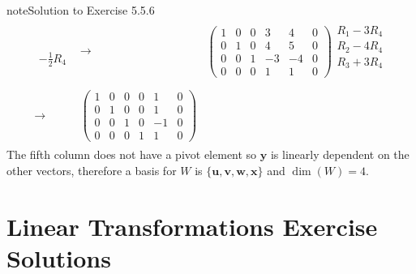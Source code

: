 \documentclass[letterpaper,10pt,english]{jupyterBook}
\begin{document}
\begin{sphinxadmonition}{note}{Solution to Exercise 5.5.6}
\begin{equation*}
\begin{split}
\begin{align*}
    \begin{matrix} \\  \\  \\ -\frac{1}{2}R_4 \end{matrix}  &
    \longrightarrow &
    \left( \begin{array}{ccccc|c}
        1 & 0 & 0 & 3 & 4 & 0 \\
        0 & 1 & 0 & 4 & 5 & 0 \\
        0 & 0 & 1 & -3 & -4 & 0 \\
        0 & 0 & 0 & 1 & 1 & 0 
    \end{array} \right)
    \begin{matrix} R_1 - 3 R_4 \\ R_2 - 4R_4 \\ R_3 + 3R_4 \\ \phantom{x} \end{matrix} \\ \\
    \longrightarrow &
    \left( \begin{array}{ccccc|c}
        1 & 0 & 0 & 0 & 1 & 0 \\
        0 & 1 & 0 & 0 & 1 & 0 \\
        0 & 0 & 1 & 0 & -1 & 0 \\
        0 & 0 & 0 & 1 & 1 & 0 
    \end{array} \right)
\end{align*} \end{split}
\end{equation*}
\sphinxAtStartPar
The fifth column does not have a pivot element so \(\mathbf{y}\) is linearly dependent on the other vectors, therefore a basis for \(W\) is \(\{ \mathbf{u}, \mathbf{v}, \mathbf{w}, \mathbf{x}\}\) and \(\dim(W) = 4\).
\end{sphinxadmonition}

\sphinxstepscope


\chapter{Linear Transformations Exercise Solutions}
\label{\detokenize{_pages/A6_Linear_transformations_exercises_solutions:linear-transformations-exercise-solutions}}\label{\detokenize{_pages/A6_Linear_transformations_exercises_solutions:transformations-exercise-solutions-section}}\label{\detokenize{_pages/A6_Linear_transformations_exercises_solutions::doc}} \label{_pages/A6_Linear_transformations_exercises_solutions:_pages/A6_Linear_transformations_exercises_solutions-solution-0}
\end{document}
